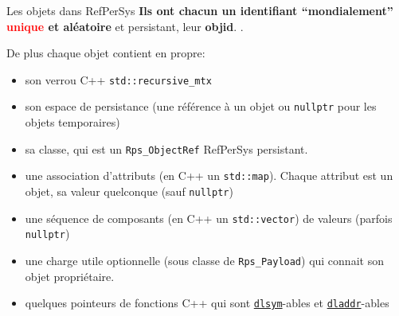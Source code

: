 \documentclass[final,a4,xcolor={svgnames,dvipsnames}]{beamer}
\begin{document}
 \begin{frame}{Les objets dans RefPerSys}
   \textbf{Ils ont chacun un identifiant ``mondialement''
     \textcolor{red}{unique} et aléatoire} et persistant, leur
   \textbf{objid}. .

   \medskip
   
   \begin{relsize}{-0.5}
   De plus chaque objet contient en propre:
   \begin{itemize}
   \item son verrou C++ \texttt{std::recursive\_mtx}
     \item son espace de persistance (une référence à un objet ou \texttt{nullptr} pour les objets temporaires)
     \item sa classe, qui est un \texttt{Rps\_ObjectRef} RefPerSys persistant.
     \item une association d'attributs (en C++ un
       \texttt{std::map}). Chaque attribut est un objet, sa valeur
       quelconque (sauf \texttt{nullptr})
     \item une séquence de composants (en C++ un \texttt{std::vector}) de valeurs (parfois \texttt{nullptr})
       \item une charge utile optionnelle (sous classe de
         \texttt{Rps\_Payload}) qui connait son objet propriétaire.
       \item quelques pointeurs de fonctions C++ qui sont
         \href{https://man7.org/linux/man-pages/man3/dlsym.3.html}{\texttt{dlsym}}-ables
         et
         \href{https://man7.org/linux/man-pages/man3/dladdr.3.html}{\texttt{dladdr}}-ables
   \end{itemize}
   \end{relsize}
   \end{frame}
\end{document}
